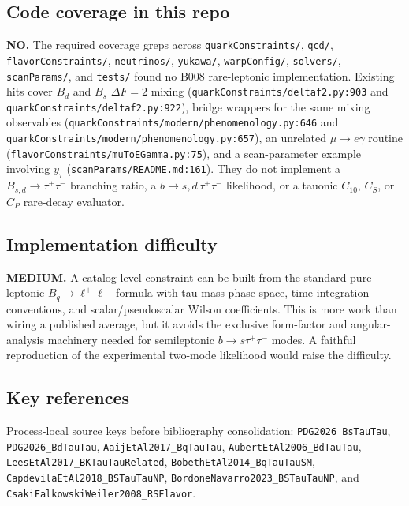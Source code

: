 \subsection*{Code coverage in this repo}
\textbf{NO.}  The required coverage greps across
\texttt{quarkConstraints/}, \texttt{qcd/}, \texttt{flavorConstraints/},
\texttt{neutrinos/}, \texttt{yukawa/}, \texttt{warpConfig/},
\texttt{solvers/}, \texttt{scanParams/}, and \texttt{tests/} found no B008
rare-leptonic implementation.  Existing hits cover \(B_d\) and \(B_s\)
\(\Delta F=2\) mixing
(\texttt{quarkConstraints/deltaf2.py:903} and
\texttt{quarkConstraints/deltaf2.py:922}), bridge wrappers for the same mixing
observables (\texttt{quarkConstraints/modern/phenomenology.py:646} and
\texttt{quarkConstraints/modern/phenomenology.py:657}), an unrelated
\(\mu\to e\gamma\) routine (\texttt{flavorConstraints/muToEGamma.py:75}), and
a scan-parameter example involving \(y_\tau\) (\texttt{scanParams/README.md:161}).
They do not implement a \(B_{s,d}\to\tau^+\tau^-\) branching ratio, a
\(b\to s,d\,\tau^+\tau^-\) likelihood, or a tauonic \(C_{10}\), \(C_S\), or
\(C_P\) rare-decay evaluator.

\subsection*{Implementation difficulty}
\textbf{MEDIUM.}  A catalog-level constraint can be built from the standard
pure-leptonic \(B_q\to\ell^+\ell^-\) formula with tau-mass phase space,
time-integration conventions, and scalar/pseudoscalar Wilson coefficients.
This is more work than wiring a published average, but it avoids the exclusive
form-factor and angular-analysis machinery needed for semileptonic
\(b\to s\tau^+\tau^-\) modes.  A faithful reproduction of the experimental
two-mode likelihood would raise the difficulty.

\subsection*{Key references}
Process-local source keys before bibliography consolidation:
\texttt{PDG2026\_BsTauTau}, \texttt{PDG2026\_BdTauTau},
\texttt{AaijEtAl2017\_BqTauTau}, \texttt{AubertEtAl2006\_BdTauTau},
\texttt{LeesEtAl2017\_BKTauTauRelated}, \texttt{BobethEtAl2014\_BqTauTauSM},
\texttt{CapdevilaEtAl2018\_BSTauTauNP},
\texttt{BordoneNavarro2023\_BSTauTauNP}, and
\texttt{CsakiFalkowskiWeiler2008\_RSFlavor}.
